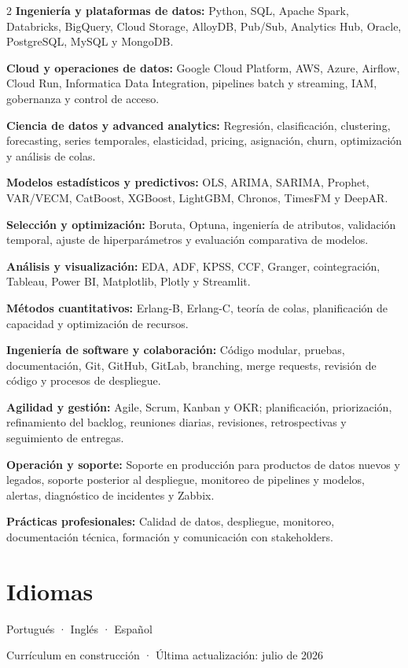 \documentclass[10pt,a4paper]{article}
\newcommand{\skill}[2]{\textbf{#1:} #2\par}
\begin{document}
\begin{multicols}{2}
\raggedcolumns
\skill{Ingeniería y plataformas de datos}{Python, SQL, Apache Spark, Databricks, BigQuery, Cloud Storage, AlloyDB, Pub/Sub, Analytics Hub, Oracle, PostgreSQL, MySQL y MongoDB.}
\skill{Cloud y operaciones de datos}{Google Cloud Platform, AWS, Azure, Airflow, Cloud Run, Informatica Data Integration, pipelines batch y streaming, IAM, gobernanza y control de acceso.}
\skill{Ciencia de datos y advanced analytics}{Regresión, clasificación, clustering, forecasting, series temporales, elasticidad, pricing, asignación, churn, optimización y análisis de colas.}
\skill{Modelos estadísticos y predictivos}{OLS, ARIMA, SARIMA, Prophet, VAR/VECM, CatBoost, XGBoost, LightGBM, Chronos, TimesFM y DeepAR.}
\skill{Selección y optimización}{Boruta, Optuna, ingeniería de atributos, validación temporal, ajuste de hiperparámetros y evaluación comparativa de modelos.}
\skill{Análisis y visualización}{EDA, ADF, KPSS, CCF, Granger, cointegración, Tableau, Power BI, Matplotlib, Plotly y Streamlit.}
\skill{Métodos cuantitativos}{Erlang-B, Erlang-C, teoría de colas, planificación de capacidad y optimización de recursos.}
\skill{Ingeniería de software y colaboración}{Código modular, pruebas, documentación, Git, GitHub, GitLab, branching, merge requests, revisión de código y procesos de despliegue.}
\skill{Agilidad y gestión}{Agile, Scrum, Kanban y OKR; planificación, priorización, refinamiento del backlog, reuniones diarias, revisiones, retrospectivas y seguimiento de entregas.}
\skill{Operación y soporte}{Soporte en producción para productos de datos nuevos y legados, soporte posterior al despliegue, monitoreo de pipelines y modelos, alertas, diagnóstico de incidentes y Zabbix.}
\skill{Prácticas profesionales}{Calidad de datos, despliegue, monitoreo, documentación técnica, formación y comunicación con stakeholders.}
\end{multicols}

\section{Idiomas}

Portugués · Inglés · Español

\vfill
{\footnotesize\color{grey} Currículum en construcción · Última actualización: julio de 2026}
\end{document}
